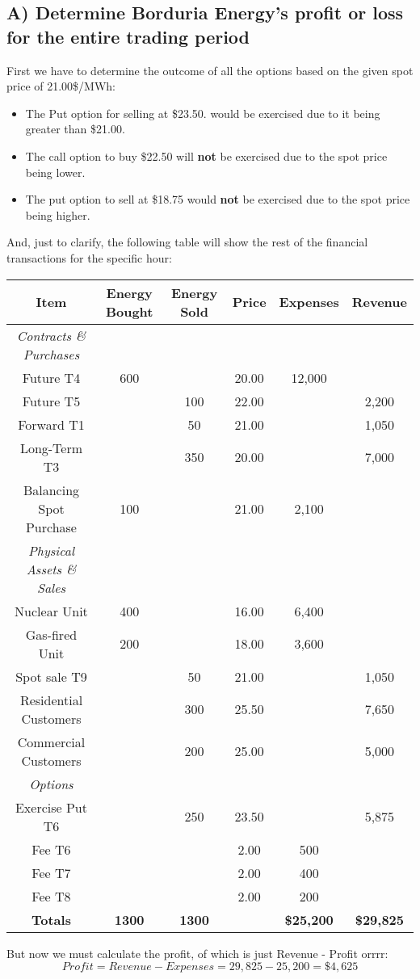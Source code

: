 \documentclass{article}
\begin{document}
\subsection{A) Determine Borduria Energy's profit or loss for the entire trading period}
First we have to determine the outcome of all the options based on the given spot price of 21.00\$/MWh:
\begin{itemize}
	\item The Put option for selling at \$23.50. would be exercised due to it being greater than \$21.00.
	\item The call option to buy \$22.50 will \textbf{not} be exercised due to the spot price being lower.
	\item The put option to sell at \$18.75 would \textbf{not} be exercised due to the spot price being higher.
\end{itemize}
And, just to clarify, the following table will show the rest of the financial transactions for the specific hour:
\begin{center}
	\begin{tabular}{||c|c|c|c|c|c||}
		\hline
		Item & Energy Bought & Energy Sold & Price & Expenses & Revenue \\
		\hline \hline
		\textit{Contracts \& Purchases} & & & & & \\
		Future T4 & 600 & & 20.00 & 12,000 & \\
		Future T5 & & 100 & 22.00 & & 2,200 \\
		Forward T1 & & 50 & 21.00 & & 1,050 \\
		Long-Term T3 & & 350 & 20.00 & & 7,000 \\
		Balancing Spot Purchase & 100 & & 21.00 & 2,100 & \\
		\hline
		\textit{Physical Assets \& Sales} & & & & & \\
		Nuclear Unit & 400 & & 16.00 & 6,400 & \\
		Gas-fired Unit & 200 & & 18.00 & 3,600 & \\
		Spot sale T9 & & 50 & 21.00 & & 1,050 \\
		Residential Customers & & 300 & 25.50 & & 7,650 \\
		Commercial Customers & & 200 & 25.00 & & 5,000 \\
		\hline
		\textit{Options} & & & & & \\
		Exercise Put T6 & & 250 & 23.50 & & 5,875 \\
		Fee T6 & & & 2.00 & 500 & \\
		Fee T7 & & & 2.00 & 400 & \\
		Fee T8 & & & 2.00 & 200 & \\
		\hline \hline
		\textbf{Totals} & \textbf{1300} & \textbf{1300} & & \textbf{\$25,200} & \textbf{\$29,825} \\
		\hline
	\end{tabular}
\end{center}
But now we must calculate the profit, of which is just Revenue - Profit orrrr:
$$ Profit = Revenue - Expenses = 29,825 - 25,200 = \$4,625 $$
\end{document}
